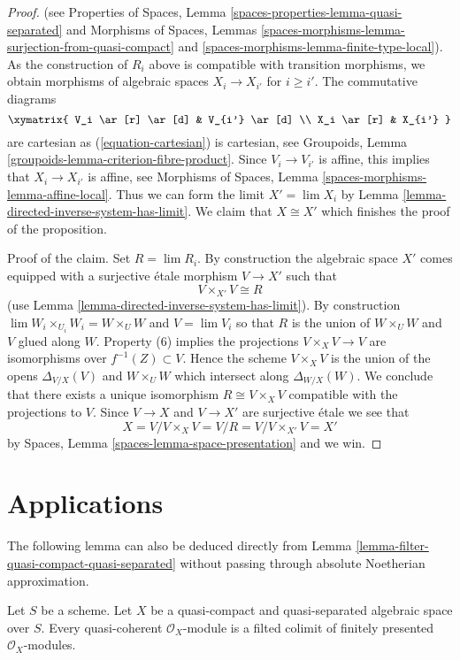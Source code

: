 \begin{proof}
(see
Properties of Spaces, Lemma \ref{spaces-properties-lemma-quasi-separated}
and
Morphisms of Spaces, Lemmas
\ref{spaces-morphisms-lemma-surjection-from-quasi-compact} and
\ref{spaces-morphisms-lemma-finite-type-local}).
As the construction of $R_i$ above is compatible
with transition morphisms, we obtain morphisms of algebraic spaces
$X_i \to X_{i'}$ for $i \geq i'$. The commutative diagrams
$$
\xymatrix{
V_i \ar[r] \ar[d] & V_{i'} \ar[d] \\
X_i \ar[r] & X_{i'}
}
$$
are cartesian as (\ref{equation-cartesian}) is cartesian, see
Groupoids, Lemma \ref{groupoids-lemma-criterion-fibre-product}.
Since $V_i \to V_{i'}$ is affine, this implies that $X_i \to X_{i'}$
is affine, see
Morphisms of Spaces, Lemma \ref{spaces-morphisms-lemma-affine-local}.
Thus we can form the limit $X' = \lim X_i$ by
Lemma \ref{lemma-directed-inverse-system-has-limit}.
We claim that $X \cong X'$ which finishes the proof of the proposition.

\medskip\noindent
Proof of the claim. Set $R = \lim R_i$.
By construction the algebraic space $X'$ comes
equipped with a surjective \'etale morphism $V \to X'$ such that
$$
V \times_{X'} V \cong R
$$
(use Lemma \ref{lemma-directed-inverse-system-has-limit}).
By construction $\lim W_i \times_{U_i} W_i = W \times_U W$ and $V = \lim V_i$
so that $R$ is the union of $W \times_U W$ and $V$ glued along $W$.
Property (6) implies the projections $V \times_X V \to V$ are isomorphisms
over $f^{-1}(Z) \subset V$. Hence the scheme $V \times_X V$ is the union
of the opens $\Delta_{V/X}(V)$ and $W \times_U W$ which intersect
along $\Delta_{W/X}(W)$. We conclude that there exists a unique isomorphism
$R \cong V \times_X V$ compatible with the projections to $V$.
Since $V \to X$ and $V \to X'$ are surjective \'etale we see that
$$
X = V/ V \times_X V = V/R = V/V \times_{X'} V = X'
$$
by Spaces, Lemma \ref{spaces-lemma-space-presentation} and we win.
\end{proof}




\section{Applications}
\label{section-applications}

\noindent
The following lemma can also be deduced directly from
Lemma \ref{lemma-filter-quasi-compact-quasi-separated}
without passing through absolute Noetherian approximation.

\begin{lemma}
\label{lemma-colimit-finitely-presented}
Let $S$ be a scheme. Let $X$ be a quasi-compact and quasi-separated algebraic
space over $S$. Every quasi-coherent $\mathcal{O}_X$-module is a
filted colimit of finitely presented $\mathcal{O}_X$-modules.
\end{lemma}

